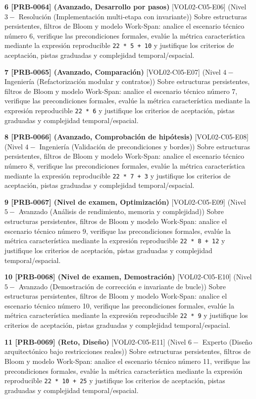 \documentclass{book}
\begin{document}
\begin{tcolorbox}[title={Ejercicios}, studiumworked, breakable]
\noindent\textbf{6 [PRB-0064] (Avanzado, Desarrollo por pasos)}
[VOL02-C05-E06] (Nivel \(3 -\) Resolución (Implementación multi-etapa con invariante)) Sobre estructuras persistentes, filtros de Bloom y modelo Work-Span: analice el escenario técnico número 6, verifique las precondiciones formales, evalúe la métrica característica mediante la expresión reproducible \texttt{22 * 5 + 10} y justifique los criterios de aceptación, pistas graduadas y complejidad temporal/espacial.

\noindent\textbf{7 [PRB-0065] (Avanzado, Comparación)}
[VOL02-C05-E07] (Nivel \(4 -\) Ingeniería (Refactorización modular y contratos)) Sobre estructuras persistentes, filtros de Bloom y modelo Work-Span: analice el escenario técnico número 7, verifique las precondiciones formales, evalúe la métrica característica mediante la expresión reproducible \texttt{22 * 6} y justifique los criterios de aceptación, pistas graduadas y complejidad temporal/espacial.

\noindent\textbf{8 [PRB-0066] (Avanzado, Comprobación de hipótesis)}
[VOL02-C05-E08] (Nivel \(4 -\) Ingeniería (Validación de precondiciones y bordes)) Sobre estructuras persistentes, filtros de Bloom y modelo Work-Span: analice el escenario técnico número 8, verifique las precondiciones formales, evalúe la métrica característica mediante la expresión reproducible \texttt{22 * 7 + 3} y justifique los criterios de aceptación, pistas graduadas y complejidad temporal/espacial.

\noindent\textbf{9 [PRB-0067] (Nivel de examen, Optimización)}
[VOL02-C05-E09] (Nivel \(5 -\) Avanzado (Análisis de rendimiento, memoria y complejidad)) Sobre estructuras persistentes, filtros de Bloom y modelo Work-Span: analice el escenario técnico número 9, verifique las precondiciones formales, evalúe la métrica característica mediante la expresión reproducible \texttt{22 * 8 + 12} y justifique los criterios de aceptación, pistas graduadas y complejidad temporal/espacial.

\noindent\textbf{10 [PRB-0068] (Nivel de examen, Demostración)}
[VOL02-C05-E10] (Nivel \(5 -\) Avanzado (Demostración de corrección e invariante de bucle)) Sobre estructuras persistentes, filtros de Bloom y modelo Work-Span: analice el escenario técnico número 10, verifique las precondiciones formales, evalúe la métrica característica mediante la expresión reproducible \texttt{22 * 9} y justifique los criterios de aceptación, pistas graduadas y complejidad temporal/espacial.

\noindent\textbf{11 [PRB-0069] (Reto, Diseño)}
[VOL02-C05-E11] (Nivel \(6 -\) Experto (Diseño arquitectónico bajo restricciones reales)) Sobre estructuras persistentes, filtros de Bloom y modelo Work-Span: analice el escenario técnico número 11, verifique las precondiciones formales, evalúe la métrica característica mediante la expresión reproducible \texttt{22 * 10 + 25} y justifique los criterios de aceptación, pistas graduadas y complejidad temporal/espacial.


\end{tcolorbox}
\end{document}
